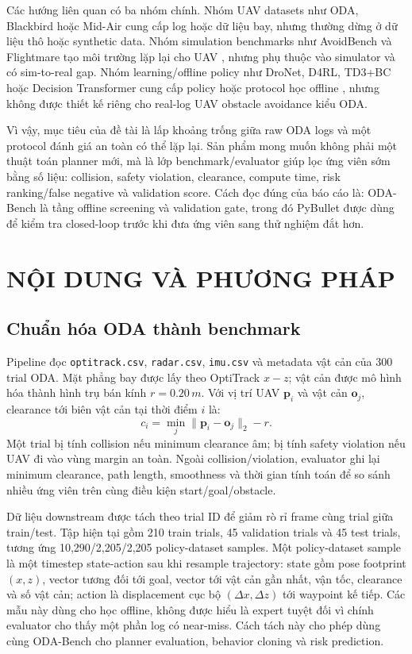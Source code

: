 \documentclass[10pt,letterpaper,twocolumn]{article}
\newcommand{\code}[1]{\texttt{#1}}
\begin{document}
Các hướng liên quan có ba nhóm chính. Nhóm UAV datasets như ODA, Blackbird hoặc Mid-Air cung cấp log hoặc dữ liệu bay, nhưng thường dừng ở dữ liệu thô hoặc synthetic data. Nhóm simulation benchmarks như AvoidBench và Flightmare tạo môi trường lặp lại cho UAV \cite{avoidbench,flightmare}, nhưng phụ thuộc vào simulator và có sim-to-real gap. Nhóm learning/offline policy như DroNet, D4RL, TD3+BC hoặc Decision Transformer cung cấp policy hoặc protocol học offline \cite{dronet,d4rl,td3bc,decisionTransformer}, nhưng không được thiết kế riêng cho real-log UAV obstacle avoidance kiểu ODA.

Vì vậy, mục tiêu của đề tài là lấp khoảng trống giữa raw ODA logs và một protocol đánh giá an toàn có thể lặp lại. Sản phẩm mong muốn không phải một thuật toán planner mới, mà là lớp benchmark/evaluator giúp lọc ứng viên sớm bằng số liệu: collision, safety violation, clearance, compute time, risk ranking/false negative và validation score. Cách đọc đúng của báo cáo là: ODA-Bench là tầng offline screening và validation gate, trong đó PyBullet được dùng để kiểm tra closed-loop trước khi đưa ứng viên sang thử nghiệm đắt hơn.

\section{NỘI DUNG VÀ PHƯƠNG PHÁP}
\subsection{Chuẩn hóa ODA thành benchmark}
Pipeline đọc \code{optitrack.csv}, \code{radar.csv}, \code{imu.csv} và metadata vật cản của 300 trial ODA. Mặt phẳng bay được lấy theo OptiTrack \(x-z\); vật cản được mô hình hóa thành hình trụ bán kính \(r=0.20\,m\). Với vị trí UAV \(\mathbf{p}_i\) và vật cản \(\mathbf{o}_j\), clearance tới biên vật cản tại thời điểm \(i\) là:
\[
  c_i=\min_j\|\mathbf{p}_i-\mathbf{o}_j\|_2-r.
\]
Một trial bị tính collision nếu minimum clearance âm; bị tính safety violation nếu UAV đi vào vùng margin an toàn. Ngoài collision/violation, evaluator ghi lại minimum clearance, path length, smoothness và thời gian tính toán để so sánh nhiều ứng viên trên cùng điều kiện start/goal/obstacle.

Dữ liệu downstream được tách theo trial ID để giảm rò rỉ frame cùng trial giữa train/test. Tập hiện tại gồm 210 train trials, 45 validation trials và 45 test trials, tương ứng 10,290/2,205/2,205 policy-dataset samples. Một policy-dataset sample là một timestep state-action sau khi resample trajectory: state gồm pose footprint \((x,z)\), vector tương đối tới goal, vector tới vật cản gần nhất, vận tốc, clearance và số vật cản; action là displacement cục bộ \((\Delta x,\Delta z)\) tới waypoint kế tiếp. Các mẫu này dùng cho học offline, không được hiểu là expert tuyệt đối vì chính evaluator cho thấy một phần log có near-miss. Cách tách này cho phép dùng cùng ODA-Bench cho planner evaluation, behavior cloning và risk prediction.
\end{document}
